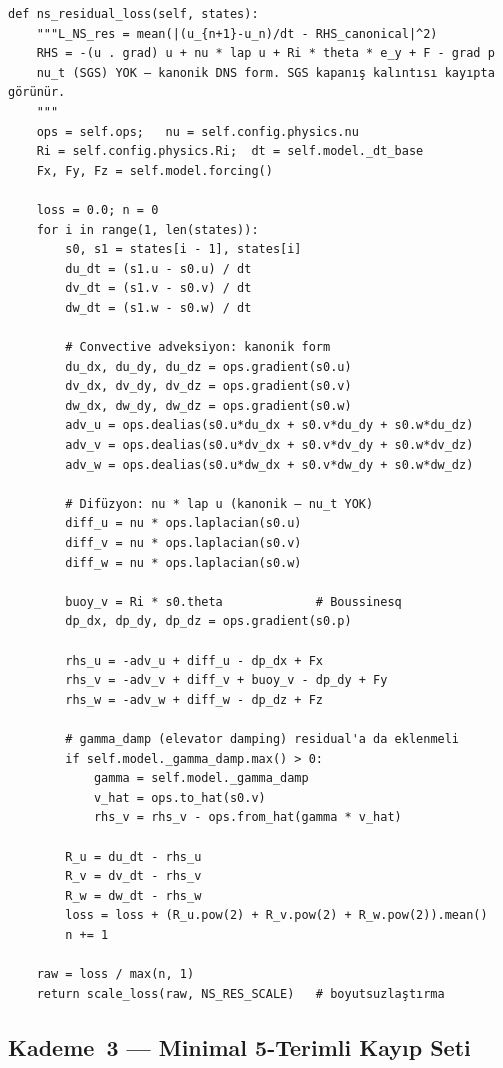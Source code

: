 \begin{lstlisting}[caption={Tier~2 momentum artık kaybı: $\mathcal{L}_{\mathrm{NS\text{-}res}}$ hesabı. Tam dosya: \texttt{train.py:992+}.}, label={code:ns_residual}]
def ns_residual_loss(self, states):
    """L_NS_res = mean(|(u_{n+1}-u_n)/dt - RHS_canonical|^2)
    RHS = -(u . grad) u + nu * lap u + Ri * theta * e_y + F - grad p
    nu_t (SGS) YOK — kanonik DNS form. SGS kapanış kalıntısı kayıpta görünür.
    """
    ops = self.ops;   nu = self.config.physics.nu
    Ri = self.config.physics.Ri;  dt = self.model._dt_base
    Fx, Fy, Fz = self.model.forcing()

    loss = 0.0; n = 0
    for i in range(1, len(states)):
        s0, s1 = states[i - 1], states[i]
        du_dt = (s1.u - s0.u) / dt
        dv_dt = (s1.v - s0.v) / dt
        dw_dt = (s1.w - s0.w) / dt

        # Convective adveksiyon: kanonik form
        du_dx, du_dy, du_dz = ops.gradient(s0.u)
        dv_dx, dv_dy, dv_dz = ops.gradient(s0.v)
        dw_dx, dw_dy, dw_dz = ops.gradient(s0.w)
        adv_u = ops.dealias(s0.u*du_dx + s0.v*du_dy + s0.w*du_dz)
        adv_v = ops.dealias(s0.u*dv_dx + s0.v*dv_dy + s0.w*dv_dz)
        adv_w = ops.dealias(s0.u*dw_dx + s0.v*dw_dy + s0.w*dw_dz)

        # Difüzyon: nu * lap u (kanonik — nu_t YOK)
        diff_u = nu * ops.laplacian(s0.u)
        diff_v = nu * ops.laplacian(s0.v)
        diff_w = nu * ops.laplacian(s0.w)

        buoy_v = Ri * s0.theta             # Boussinesq
        dp_dx, dp_dy, dp_dz = ops.gradient(s0.p)

        rhs_u = -adv_u + diff_u - dp_dx + Fx
        rhs_v = -adv_v + diff_v + buoy_v - dp_dy + Fy
        rhs_w = -adv_w + diff_w - dp_dz + Fz

        # gamma_damp (elevator damping) residual'a da eklenmeli
        if self.model._gamma_damp.max() > 0:
            gamma = self.model._gamma_damp
            v_hat = ops.to_hat(s0.v)
            rhs_v = rhs_v - ops.from_hat(gamma * v_hat)

        R_u = du_dt - rhs_u
        R_v = dv_dt - rhs_v
        R_w = dw_dt - rhs_w
        loss = loss + (R_u.pow(2) + R_v.pow(2) + R_w.pow(2)).mean()
        n += 1

    raw = loss / max(n, 1)
    return scale_loss(raw, NS_RES_SCALE)   # boyutsuzlaştırma
\end{lstlisting}

\subsection{Kademe~3 — Minimal 5-Terimli Kayıp Seti}
\label{subsec:tier3_minimal_loss}

